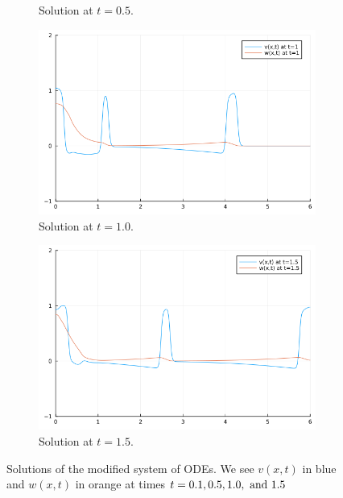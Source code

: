 \documentclass[12pt]{report}
\begin{document}
\begin{solution}
\begin{figure}[H]
\begin{subfigure}[b]{0.45\linewidth}
            \caption{Solution at $t=0.5$.}
            \label{5sol:b}
            \vspace{4ex}
        \end{subfigure}
        \begin{subfigure}[b]{0.45\linewidth}
            \centering
            \includegraphics[width=\linewidth]{images/5-3.png}
            \caption{Solution at $t=1.0$.}
            \label{5sol:c}
            \vspace{4ex}
        \end{subfigure}%
        \begin{subfigure}[b]{0.45\linewidth}
            \centering
            \includegraphics[width=\linewidth]{images/5-4.png}
            \caption{Solution at $t=1.5$.}
            \label{5sol:d}
            \vspace{4ex}
        \end{subfigure}
        \caption{Solutions of the modified system of ODEs. We see $v(x,t)$ in blue and $w(x,t)$ in orange at times $t=0.1,0.5,1.0,{~\text{and}~} 1.5$}
        \label{5sol}
    \end{figure}
\end{solution}
\end{document}
